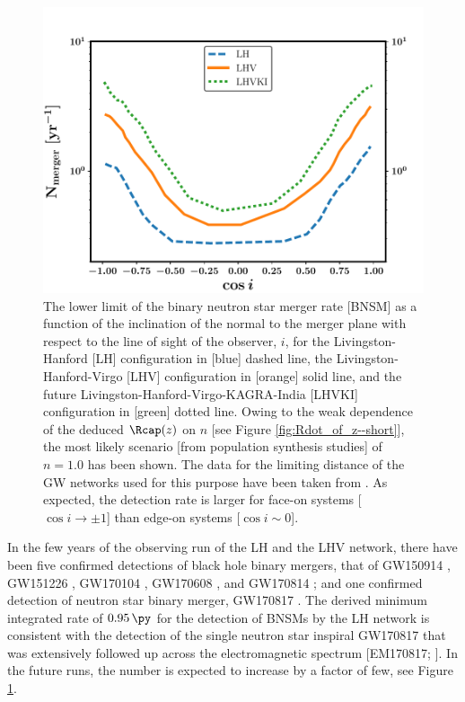 \begin{figure}
\begin{center}
\includegraphics[scale=0.6]{BNSMr_lower_limits}
\caption[The lower limit of the binary neutron star merger rate for past, present, and future gravitational wave networks]{The lower limit of the binary neutron star merger rate [BNSM] as a function of the inclination of the normal to the merger plane with respect to the line of sight of the observer, $i$, for the Livingston-Hanford [LH] configuration in [blue] dashed line, the Livingston-Hanford-Virgo [LHV] configuration in [orange] solid line, and the future Livingston-Hanford-Virgo-KAGRA-India [LHVKI] configuration in [green] dotted line. Owing to the weak dependence of the deduced $ \Rcap(z) $ on $n$ [see Figure \ref{fig:Rdot_of_z--short}], the most likely scenario [from population synthesis studies] of $n = 1.0$ has been shown. The data for the limiting distance of the GW networks used for this purpose have been taken from \citealt{Saleem_et_al.-2018-MNRAS}. As expected, the detection rate is larger for face-on systems [$\cos i \to \pm 1$] than edge-on systems [$\cos i \sim 0$].}
\label{fig:merger-rate}
\end{center}
\end{figure}


In the few years of the observing run of the LH and the LHV network, there have been five confirmed detections of black hole binary mergers, that of GW150914 \citep{GW150914-2016}, GW151226 \citep{GW151226-2016}, GW170104 \citep{GW170104-2017}, GW170608 \citep{GW170608-2017}, and GW170814 \citep{GW170814-2017}; and one confirmed detection of neutron star binary merger, GW170817 \citep{GW170817-2017}. The derived minimum integrated rate of $0.95 \, \py$ for the detection of BNSMs by the LH network is consistent with the detection of the single neutron star inspiral GW170817 that was extensively followed up across the electromagnetic spectrum [EM170817; \cite{EM170817-2017}]. In the future runs, the number is expected to increase by a factor of few, see Figure \ref{fig:merger-rate}.

